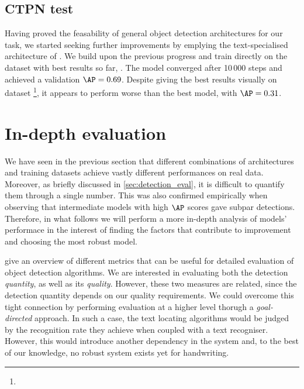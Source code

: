 	\subsection{CTPN test}
		Having proved the feasability of general object detection architectures for our task, we started seeking further improvements by emplying the text-specialised architecture of \CTPN{}. We build upon the previous progress and train directly on the dataset with best results so far, . The model converged after 10\,000 steps and achieved a validation \(\AP = 0.69\). Despite giving the best results visually on  dataset \footnote{}, it appears to perform worse than the best \FRCNN{} model, with \(\AP = 0.31\).




\section{In-depth evaluation}\label{sec:detection_results}

	We have seen in the previous section that different combinations of architectures and training datasets achieve vastly different performances on real data. Moreover, as briefly discussed in \autoref{sec:detection_eval}, it is difficult to quantify them through a single number. This was also confirmed empirically when observing that intermediate models with high \(\AP\) scores gave subpar detections. Therefore, in what follows we will perform a more in-depth analysis of models' performace in the interest of finding the factors that contribute to improvement and choosing the most robust model.

	 give an overview of different metrics that can be useful for detailed evaluation of object detection algorithms. We are interested in evaluating both the detection \emph{quantity}, as well as its \emph{quality}. However, these two measures are related, since the detection quantity depends on our quality requirements. We could overcome this tight connection by performing evaluation at a higher level thorugh a \emph{goal-directed} approach. In such a case, the text locating algorithms would be judged by the recognition rate they achieve when coupled with a text recogniser. However, this would introduce another dependency in the system and, to the best of our knowledge, no robust system exists yet for handwriting.

